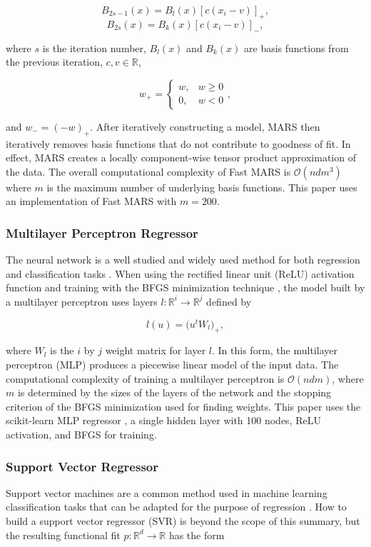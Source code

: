 \documentclass{scspaperproc}
\theoremstyle{scsthe}
\begin{document}
$$ B_{2s-1}(x) = B_l(x) [c(x_i-v)]_+ ,$$
$$ B_{2s}(x) = B_k(x) [c(x_i-v)]_- ,$$

where $s$ is the iteration number, $B_l(x)$ and $B_k(x)$ are basis
functions from the previous iteration, $c, v \in \mathbb{R}$, 

$$w_+ = \begin{cases} w, & w \geq 0 \\ 0, & w < 0 \end{cases},$$

and $w_- = (-w)_+$. After iteratively constructing a model, MARS then
iteratively removes basis functions that do not contribute to goodness
of fit. In effect, MARS creates a locally component-wise tensor
product approximation of the data. The overall computational
complexity of Fast MARS is $\mathcal{O}(n d m^3)$ where $m$ is the
maximum number of underlying basis functions. This paper uses an
implementation of Fast MARS  with $m =
200$.

\vspace{-10pt}
\subsubsection{Multilayer Perceptron Regressor}
\vspace{-10pt}
The neural network is a well studied and widely used method for both
regression and classification tasks
. When using the rectified linear unit
(ReLU) activation function  and training
with the BFGS minimization technique , the
model built by a multilayer perceptron uses layers $l : \mathbb{R}^{i}
\rightarrow \mathbb{R}^{j}$ defined by

$$ l(u) = \big( u^t W_l \big)_+ ,$$

where $W_l$ is the $i$ by $j$ weight matrix for layer $l$. In this
form, the multilayer perceptron (MLP) produces a piecewise linear
model of the input data. The computational complexity of training a
multilayer perceptron is $\mathcal{O}(n d m)$, where $m$ is
determined by the sizes of the layers of the network and the stopping
criterion of the BFGS minimization used for finding weights. This
paper uses the scikit-learn MLP regressor , a
single hidden layer with 100 nodes, ReLU activation, and BFGS for
training.

\subsubsection{Support Vector Regressor}
\vspace{-10pt}
Support vector machines are a common method used in machine learning
classification tasks that can be adapted for the purpose of regression
. How to build a support vector regressor
(SVR) is beyond the scope of this summary, but the resulting
functional fit $p : \mathbb{R}^d \rightarrow \mathbb{R}$ has the form
\end{document}
